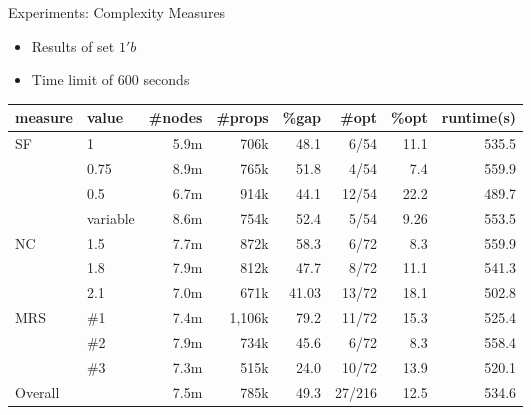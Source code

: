 \documentclass{beamer}
\begin{document}
\begin{frame}{Experiments: Complexity Measures}
	\begin{itemize}
		\item Results of set $1'b$
		\item Time limit of 600 seconds \pause
	\end{itemize}
	\begin{table}[H]
		\begin{adjustwidth}{-.9in}{-.9in}
			\centering
			\scriptsize
			\begin{tabular}{llrrrrrr}
				\toprule
				measure & value  & \#nodes & \#props & \%gap & \#opt & \%opt &  runtime(s) \\
				\midrule
				SF & 1 & 5.9m & 706k & 48.1 & 6/54 & 11.1 & 535.5 \\
				 & 0.75 & 8.9m & 765k & 51.8 & 4/54 & 7.4 & 559.9 \\
				 & 0.5 & 6.7m & 914k & 44.1 & 12/54 & 22.2 & 489.7 \\
				 & variable & 8.6m & 754k & 52.4 & 5/54 & 9.26 & 553.5 \\\midrule
				NC & 1.5 & 7.7m & 872k & 58.3 & 6/72 & 8.3 & 559.9 \\
				 & 1.8 & 7.9m & 812k & 47.7 & 8/72 & 11.1 & 541.3 \\
				 & 2.1 & 7.0m & 671k & 41.03 & 13/72 & 18.1 & 502.8 \\\midrule
				MRS & \#1 & 7.4m & 1,106k & 79.2 & 11/72 & 15.3 & 525.4 \\
				 & \#2 & 7.9m & 734k & 45.6 & 6/72 & 8.3 & 558.4 \\
				 & \#3 & 7.3m & 515k & 24.0 & 10/72 & 13.9 & 520.1 \\\midrule
				Overall &  & 7.5m & 785k & 49.3 & 27/216 & 12.5 & 534.6 \\\bottomrule
			\end{tabular}
		\end{adjustwidth}
	\end{table}
\end{frame}
\end{document}

